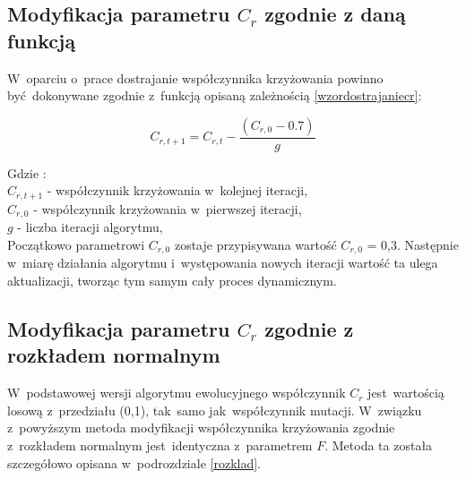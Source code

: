 \subsection{Modyfikacja parametru $C_{r}$ zgodnie z daną funkcją}\label{funkcjacr}

W~oparciu o~prace \cite{modf} dostrajanie współczynnika krzyżowania powinno być~dokonywane zgodnie z~funkcją opisaną zależnością \ref{wzordostrajaniecr}:

\begin{equation}
C_{r, t+1} = C_{r,t} - \frac{(C_{r,0} - 0.7)}{g}
\label{wzordostrajaniecr}
\end{equation}

Gdzie :\\
$ C_{r, t+1} $ - współczynnik krzyżowania w~kolejnej iteracji, \\
$ C_{r, 0} $ - współczynnik krzyżowania w~pierwszej iteracji, \\
$g$ - liczba iteracji algorytmu, \\

Początkowo parametrowi $ C_{r, 0} $ zostaje przypisywana wartość $ C_{r, 0} $ = 0,3. Następnie w~miarę działania algorytmu i~występowania nowych iteracji wartość ta ulega aktualizacji, tworząc tym samym cały proces dynamicznym.


\subsection{Modyfikacja parametru $C_{r}$ zgodnie z rozkładem normalnym}\label{gauss2}

W~podstawowej wersji algorytmu ewolucyjnego współczynnik $C_{r}$ jest~wartością losową z~przedziału (0,1), tak~samo jak~współczynnik mutacji. W~związku z~powyższym metoda modyfikacji współczynnika krzyżowania zgodnie z~rozkładem normalnym jest~identyczna z~parametrem $F$. Metoda ta została szczegółowo opisana w~podrozdziale \ref{rozklad}.





